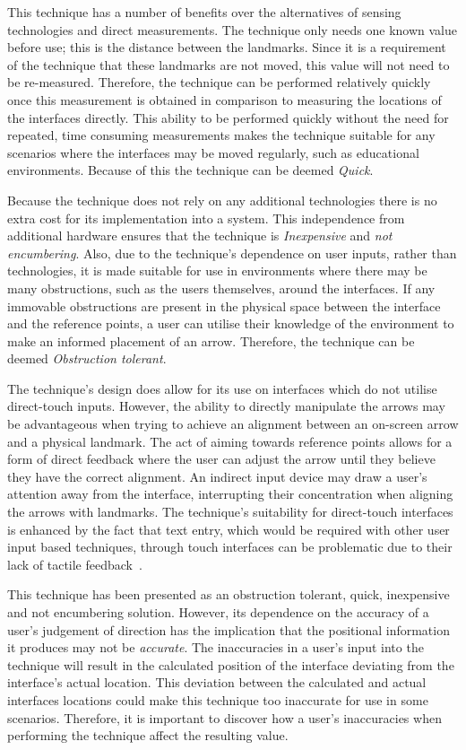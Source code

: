 \documentclass{bmcart}
\begin{document}
This technique has a number of benefits over the alternatives of sensing technologies and direct measurements.
The technique only needs one known value before use; this is the distance between the landmarks.
Since it is a requirement of the technique that these landmarks are not moved, this value will not need to be re-measured.
Therefore, the technique can be performed relatively quickly once this measurement is obtained in comparison to measuring the locations of the interfaces directly.
This ability to be performed quickly without the need for repeated, time consuming measurements makes the technique suitable for any scenarios where the interfaces may be moved regularly, such as educational environments.
Because of this the technique can be deemed {\emph{Quick}}.

Because the technique does not rely on any additional technologies there is no extra cost for its implementation into a system.
This independence from additional hardware ensures that the technique is {\emph{Inexpensive}} and {\emph{not encumbering}}.
Also, due to the technique's dependence on user inputs, rather than technologies, it is made suitable for use in environments where there may be many obstructions, such as the users themselves, around the interfaces.
If any immovable obstructions are present in the physical space between the interface and the reference points, a user can utilise their knowledge of the environment to make an informed placement of an arrow.
Therefore, the technique can be deemed {\emph{Obstruction tolerant}}.

The technique's design does allow for its use on interfaces which do not utilise direct-touch inputs.
However, the ability to directly manipulate the arrows may be advantageous when trying to achieve an alignment between an on-screen arrow and a physical landmark. 
The act of aiming towards reference points allows for a form of direct feedback where the user can adjust the arrow until they believe they have the correct alignment.  
An indirect input device may draw a user's attention away from the interface, interrupting their concentration when aligning the arrows with landmarks.
The technique's suitability for direct-touch interfaces is enhanced by the fact that text entry, which would be required with other user input based techniques, through touch interfaces can be problematic due to their lack of tactile feedback~\cite{Weiss2009}.

This technique has been presented as an obstruction tolerant, quick, inexpensive and not encumbering solution.
However, its dependence on the accuracy of a user's judgement of direction has the implication that the positional information it produces may not be {\emph{accurate}}.
The inaccuracies in a user's input into the technique will result in the calculated position of the interface deviating from the interface's actual location.
This deviation between the calculated and actual interfaces locations could make this technique too inaccurate for use in some scenarios.
Therefore, it is important to discover how a user's inaccuracies when performing the technique affect the resulting value.
\end{document}
